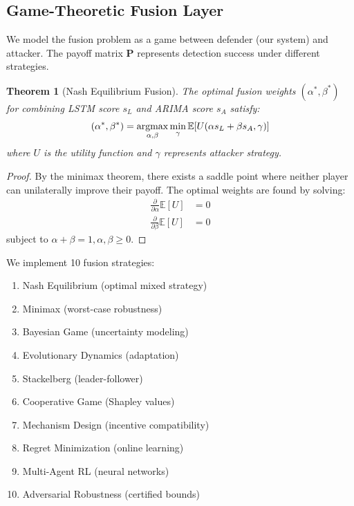 \documentclass[10pt,conference]{IEEEtran}
\newtheorem{theorem}{Theorem}
\newcommand{\argmax}{\operatornamewithlimits{argmax}}
\begin{document}
\subsection{Game-Theoretic Fusion Layer}

We model the fusion problem as a game between defender (our system) and attacker. The payoff matrix $\mathbf{P}$ represents detection success under different strategies.

\begin{theorem}[Nash Equilibrium Fusion]
The optimal fusion weights $(\alpha^*, \beta^*)$ for combining LSTM score $s_L$ and ARIMA score $s_A$ satisfy:
\begin{equation}
(\alpha^*, \beta^*) = \argmax_{\alpha,\beta} \min_{\gamma} \mathbb{E}[U(\alpha s_L + \beta s_A, \gamma)]
\end{equation}
where $U$ is the utility function and $\gamma$ represents attacker strategy.
\end{theorem}

\begin{proof}
By the minimax theorem, there exists a saddle point where neither player can unilaterally improve their payoff. The optimal weights are found by solving:
\begin{align}
\frac{\partial}{\partial \alpha} \mathbb{E}[U] &= 0 \\
\frac{\partial}{\partial \beta} \mathbb{E}[U] &= 0
\end{align}
subject to $\alpha + \beta = 1, \alpha,\beta \geq 0$.
\end{proof}

We implement 10 fusion strategies:
\begin{enumerate}
    \item Nash Equilibrium (optimal mixed strategy)
    \item Minimax (worst-case robustness)
    \item Bayesian Game (uncertainty modeling)
    \item Evolutionary Dynamics (adaptation)
    \item Stackelberg (leader-follower)
    \item Cooperative Game (Shapley values)
    \item Mechanism Design (incentive compatibility)
    \item Regret Minimization (online learning)
    \item Multi-Agent RL (neural networks)
    \item Adversarial Robustness (certified bounds)
\end{enumerate}
\end{document}
